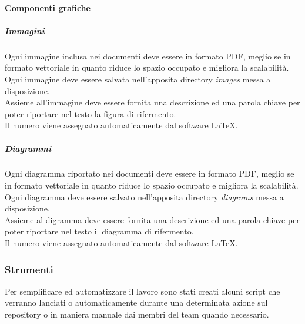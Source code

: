 			\paragraph{Componenti grafiche}

				\subparagraph{Immagini}
				Ogni immagine inclusa nei documenti deve essere in formato PDF, meglio se in formato vettoriale in quanto riduce lo spazio occupato e migliora la scalabilità.\\
				Ogni immagine deve essere salvata nell'apposita directory \emph{images} messa a disposizione.\\
				Assieme all'immagine deve essere fornita una descrizione ed una parola chiave per poter riportare nel testo la figura di rifermento.\\
				Il numero viene assegnato automaticamente dal software \LaTeX.

				\subparagraph{Diagrammi}
				Ogni diagramma riportato nei documenti deve essere in formato PDF, meglio se in formato vettoriale in quanto riduce lo spazio occupato e migliora la scalabilità.\\
				Ogni diagramma deve essere salvato nell'apposita directory \emph{diagrams} messa a disposizione.\\
				Assieme al digramma deve essere fornita una descrizione ed una parola chiave per poter riportare nel testo il diagramma di rifermento.\\
				Il numero viene assegnato automaticamente dal software \LaTeX.


		\subsubsection{Strumenti} %
		\label{ssub:strumenti}
		Per semplificare ed automatizzare il lavoro sono stati creati alcuni script che verranno lanciati o automaticamente durante una determinata azione sul repository o in maniera manuale dai membri del team quando necessario.
